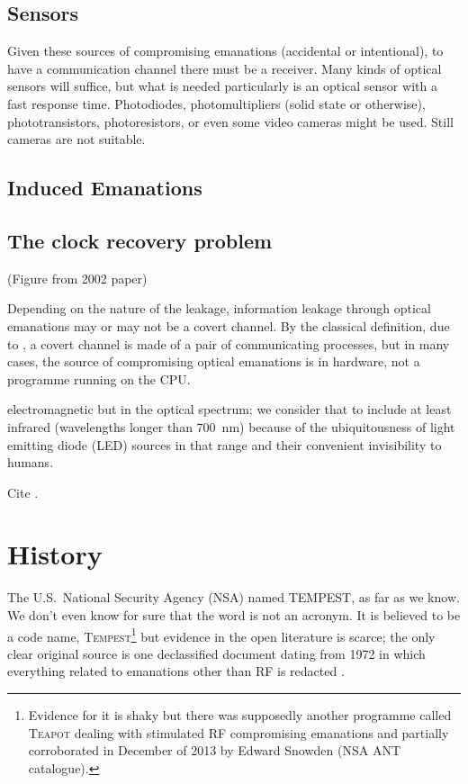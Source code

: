 \documentclass[a4paper,twoside,oldfontcommands]{memoir}
\begin{document}
\subsection{Sensors}
Given these sources of compromising emanations (accidental or intentional), to
have a communication channel there must be a receiver. Many kinds of optical
sensors will suffice, but what is needed particularly is an optical sensor with
a fast response time. Photodiodes, photomultipliers (solid state or otherwise),
phototransistors, photoresistors, or even some video cameras might be used.
Still cameras are not suitable.
\subsection{Induced Emanations}

\subsection{The clock recovery problem}

(Figure from 2002 paper)

Depending on the nature of the leakage, information leakage through optical
emanations may or may not be a covert channel. By the classical definition,
due to \cite{Lampson1973}, a covert channel is made of a pair of communicating
processes, but in many cases, the source of compromising optical emanations
is in hardware, not a programme running on the CPU.

electromagnetic but in the optical spectrum; we consider that to include at
least infrared (wavelengths longer than \SI{700}{\nano\metre}) because of the
ubiquitousness of light emitting diode (LED) sources in that range and their
convenient invisibility to humans.


Cite \cite{Allain2019}.

\section{History}
The U.S.\ National Security Agency (NSA) named TEMPEST, as far as we know. We
don't even know for sure that the word is not an acronym. It is believed to
be a code name, \textsc{Tempest}\footnote{Evidence for it is shaky but there
was supposedly another programme called \textsc{Teapot} dealing with
stimulated RF compromising emanations \cite[p.~539]{Anderson2008a} and
partially corroborated in December of 2013 by Edward Snowden (NSA ANT
catalogue).} but evidence in the open literature is scarce; the only clear
original source is one declassified document dating from 1972 in which
everything related to emanations other than RF is redacted
\cite{NSAtempest2007}.
\end{document}
